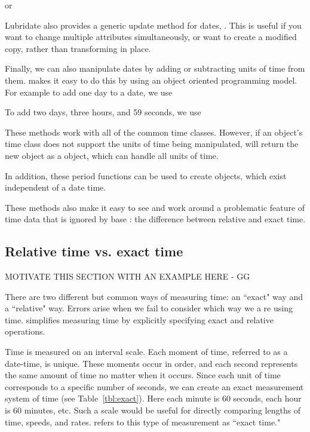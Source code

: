 \documentclass[article]{jss}
\begin{document}

or


Lubridate also provides a generic update method for dates, .  This is useful if you want to change multiple attributes simultaneously, or want to create a modified copy, rather than transforming in place.


Finally, we can also manipulate dates by adding or subtracting units of time from them.  makes it easy to do this by using an object oriented programming model. For example to add one day to a date, we use


To add two days, three hours, and 59 seconds, we use


These methods work with all of the common time classes. However, if an object's time class does not support the units of time being manipulated,  will return the new object as a  object, which can handle all units of time.

In addition, these period functions can be used to create  objects, which exist independent of a date time.


These methods also make it easy to see and work around a problematic feature of time data that is ignored by base : the difference between relative and exact time.


\subsection{Relative time vs. exact time}

MOTIVATE THIS SECTION WITH AN EXAMPLE HERE - GG

There are two different but common ways of measuring time: an ``exact" way and a ``relative" way.  Errors arise when we fail to consider which way we a re using time.   simplifies measuring time by explicitly specifying exact and relative operations.

Time is measured on an interval scale. Each moment of time, referred to as a date-time, is unique.  These moments occur in order, and each second represents the same amount of time no matter when it occurs.  Since each unit of time corresponds to a specific number of seconds, we can create an exact measurement system of time (see Table~\ref{tbl:exact}). Here each minute is 60 seconds, each hour is 60 minutes, etc. Such a scale would be useful for directly comparing lengths of time, speeds, and rates.  refers to this type of measurement as ``exact time."
\end{document}
